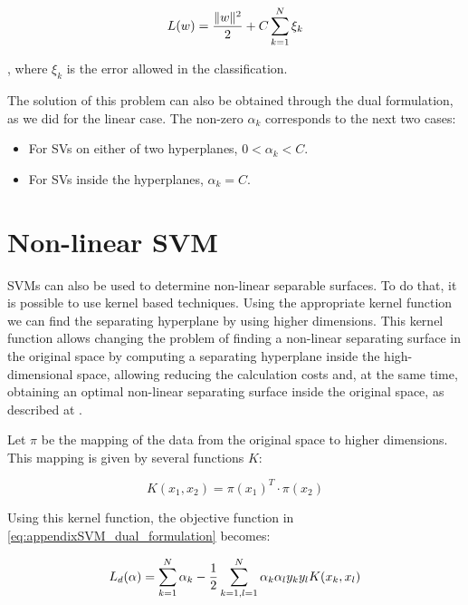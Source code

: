 \begin{equation}\label{eq:appendixSVM_soft_objective_function}
 L(w) = {{\|w\|^2} \over 2} + C \sum_{k=1}^N \xi_k
\end{equation}

, where $\xi_k$ is the error allowed in the classification.

The solution of this problem can also be obtained through the dual formulation, as we did for the linear case. The non-zero $\alpha_k$ corresponds to the next two cases:
\begin{itemize}
 \item For SVs on either of two hyperplanes, $0 < \alpha_k < C$.
 \item For SVs inside the hyperplanes, $\alpha_k = C $.
\end{itemize}

\section{Non-linear \ac{SVM}}\label{ch:appendixSVM_03}

\acp{SVM} can also be used to determine non-linear separable surfaces. To do that, it is possible to use kernel based techniques. Using the appropriate kernel function we can find the separating hyperplane by using higher dimensions. This kernel function allows changing the problem of finding a non-linear separating surface in the original space by computing a separating hyperplane inside the high-dimensional space, allowing reducing the calculation costs and, at the same time, obtaining an optimal non-linear separating surface inside the original space, as described at \cite{burges1998tutorial}.

Let $\pi$ be the mapping of the data from the original space to higher dimensions. This mapping is given by several functions $K$:

\begin{equation}\label{eq:appendixSVM_kernel_func}
 K(x_1, x_2) = \pi(x_1)^T \cdot \pi(x_2)
\end{equation}

Using this kernel function, the objective function in \ref{eq:appendixSVM_dual_formulation} becomes:

\begin{equation}\label{eq:appendixSVM_soft_formulation}
 L_d(\alpha) = \sum_{k=1}^N  \alpha_k - {1 \over 2} \sum_{k = 1, l=1}^N \alpha_k \alpha_l y_k y_l K(x_k, x_l)
\end{equation}

